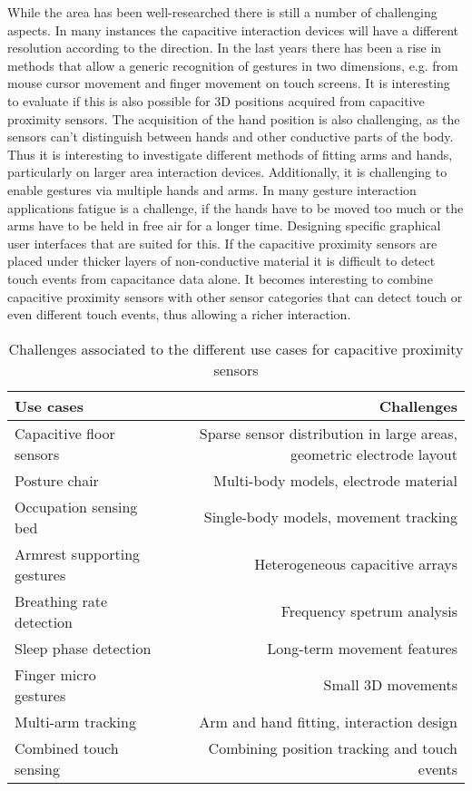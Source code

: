 While the area has been well-researched there is still a number of challenging aspects. In many instances the capacitive interaction devices will have a different resolution according to the direction. In the last years there has been a rise in methods that allow a generic recognition of gestures in two dimensions, e.g. from mouse cursor movement and finger movement on touch screens. It is interesting to evaluate if this is also possible for 3D positions acquired from capacitive proximity sensors. The acquisition of the hand position is also challenging, as the sensors can't distinguish between hands and other conductive parts of the body. Thus it is interesting to investigate different methods of fitting arms and hands, particularly on larger area interaction devices. Additionally, it is challenging to enable gestures via multiple hands and arms. In many gesture interaction applications fatigue is a challenge, if the hands have to be moved too much or the arms have to be held in free air for a longer time. Designing specific graphical user interfaces that are suited for this. If the capacitive proximity sensors are placed under thicker layers of non-conductive material it is difficult to detect touch events from capacitance data alone. It becomes interesting to combine capacitive proximity sensors with other sensor categories that can detect touch or even different touch events, thus allowing a richer interaction. 
\begin{table}[htbp]
  \centering
  \caption{Challenges associated to the different use cases for capacitive proximity sensors}
    \begin{tabular}{lr}
    \toprule
    Use cases & Challenges \\
    \midrule
    Capacitive floor sensors & Sparse sensor distribution in large areas, geometric electrode layout \\
    Posture chair & Multi-body models, electrode material \\
    Occupation sensing bed & Single-body models, movement tracking \\
    Armrest supporting gestures & Heterogeneous capacitive arrays \\
    Breathing rate detection & Frequency spetrum analysis \\
    Sleep phase detection & Long-term movement features \\
    Finger micro gestures & Small 3D movements \\
    Multi-arm tracking & Arm and hand fitting, interaction design \\
    Combined touch sensing & Combining position tracking and touch events \\
    \bottomrule
    \end{tabular}%
  \label{tab:usecase_challenge}%
\end{table}%


